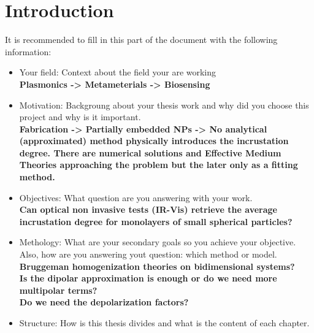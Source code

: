 
\chapter*{Introduction}
\label{chapter:intro}


 It is recommended to fill in this part of the document with the following information:

\begin{itemize}
	\item Your field: Context about the field your are working \\
	\textbf{Plasmonics -> Metameterials -> Biosensing}
	\item Motivation: Backgroung about your thesis work and why did you choose this project and why is it important.\\
	\textbf{Fabrication -> Partially embedded NPs -> No analytical (approximated) method physically introduces the incrustation degree. There are numerical solutions and Effective Medium Theories approaching the problem but the later only as a fitting method. }
	\item Objectives: What question are you answering with your work.\\
	\textbf{Can optical non invasive tests (IR-Vis) retrieve the average incrustation degree for monolayers of small spherical particles?}
	\item Methology: What are your secondary goals so you achieve your objective. Also, how are you answering yout question: which method or model.\\
	\textbf{Bruggeman homogenization theories on bidimensional systems?\\
	Is the dipolar approximation is enough or do we need more multipolar terms?\\
	Do we need the depolarization factors?}
	\item Structure: How is this thesis divides and what is the content of each chapter.
\end{itemize}

